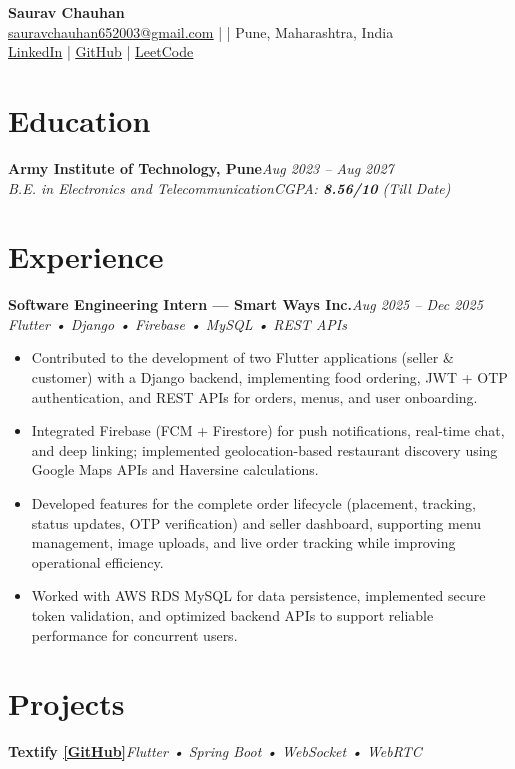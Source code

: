 \documentclass[12pt]{article}
\newcommand{\resumeItem}[1]{\item\small #1}
\newcommand{\resumeSubHeading}[4]{
\textbf{#1}\hfill\textit{#2}\\
\textit{#3}\hfill\textit{#4}\\[-2pt]
}
\newcommand{\resumeSection}[1]{
\section*{#1}
}
\newcommand{\resumeProjectHeading}[2]{
\textbf{#1}\hfill\textit{#2}
}
\begin{document}
\begin{center}
{\LARGE\textbf{Saurav Chauhan}}\\[2pt]
\href{mailto:sauravchauhan652003@gmail.com}{\underline{sauravchauhan652003@gmail.com}}
\;|
\;|\;
Pune, Maharashtra, India\\[2pt]
\href{https://www.linkedin.com/in/saurav-chauhan-97720225a/}{\underline{LinkedIn}}
\;|\;
\href{https://github.com/sauravchauhan2003}{\underline{GitHub}}
\;|\;
\href{https://leetcode.com/u/saurav_chauhan2003/}{\underline{LeetCode}}
\end{center}

\resumeSection{Education}

\resumeSubHeading
{Army Institute of Technology, Pune}{Aug 2023 -- Aug 2027}
{B.E. in Electronics and Telecommunication}{CGPA: \textbf{8.56/10} (Till Date)}

\resumeSection{Experience}

\resumeSubHeading
{Software Engineering Intern --- Smart Ways Inc.}{Aug 2025 -- Dec 2025}
{Flutter • Django • Firebase • MySQL • REST APIs}{}

\begin{itemize}
\resumeItem{Contributed to the development of two Flutter applications (seller \& customer) with a Django backend, implementing food ordering, JWT + OTP authentication, and REST APIs for orders, menus, and user onboarding.}

\resumeItem{Integrated Firebase (FCM + Firestore) for push notifications, real-time chat, and deep linking; implemented geolocation-based restaurant discovery using Google Maps APIs and Haversine calculations.}

\resumeItem{Developed features for the complete order lifecycle (placement, tracking, status updates, OTP verification) and seller dashboard, supporting menu management, image uploads, and live order tracking while improving operational efficiency.}

\resumeItem{Worked with AWS RDS MySQL for data persistence, implemented secure token validation, and optimized backend APIs to support reliable performance for concurrent users.}
\end{itemize}

\resumeSection{Projects}

\resumeProjectHeading
{Textify \hspace{4pt}
\href{https://github.com/sauravchauhan2003/TextifyBackendRevamped}{\underline{[GitHub]}}}
{Flutter • Spring Boot • WebSocket • WebRTC}
\end{document}
